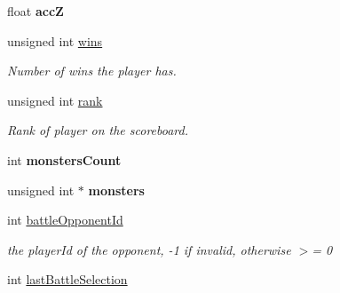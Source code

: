 \begin{DoxyCompactItemize}
\item 
\hypertarget{class_game_state_1_1_player_abec98fdec68ed34c3ff6bf202d4ac446}{float {\bfseries acc\-Z}}\label{class_game_state_1_1_player_abec98fdec68ed34c3ff6bf202d4ac446}

\item 
\hypertarget{class_game_state_1_1_player_aac7333a06ea194848f12090be762cdd6}{unsigned int \hyperlink{class_game_state_1_1_player_aac7333a06ea194848f12090be762cdd6}{wins}}\label{class_game_state_1_1_player_aac7333a06ea194848f12090be762cdd6}

\begin{DoxyCompactList}\small\item\em Number of wins the player has. \end{DoxyCompactList}\item 
\hypertarget{class_game_state_1_1_player_a43dd8a9e79c35d9615596fb6ab25d653}{unsigned int \hyperlink{class_game_state_1_1_player_a43dd8a9e79c35d9615596fb6ab25d653}{rank}}\label{class_game_state_1_1_player_a43dd8a9e79c35d9615596fb6ab25d653}

\begin{DoxyCompactList}\small\item\em Rank of player on the scoreboard. \end{DoxyCompactList}\item 
\hypertarget{class_game_state_1_1_player_a7f5bbae042c927e8dd0f27a189a18dea}{int {\bfseries monsters\-Count}}\label{class_game_state_1_1_player_a7f5bbae042c927e8dd0f27a189a18dea}

\item 
\hypertarget{class_game_state_1_1_player_a2cc3642e98d820c6e4fce5864254c79e}{unsigned int $\ast$ {\bfseries monsters}}\label{class_game_state_1_1_player_a2cc3642e98d820c6e4fce5864254c79e}

\item 
\hypertarget{class_game_state_1_1_player_ae60a4f411ef984c6d649d98c65b274bd}{int \hyperlink{class_game_state_1_1_player_ae60a4f411ef984c6d649d98c65b274bd}{battle\-Opponent\-Id}}\label{class_game_state_1_1_player_ae60a4f411ef984c6d649d98c65b274bd}

\begin{DoxyCompactList}\small\item\em the player\-Id of the opponent, -\/1 if invalid, otherwise $>$= 0 \end{DoxyCompactList}\item 
\hypertarget{class_game_state_1_1_player_a2383ab7d3783c5122f3e68230069eb2e}{int \hyperlink{class_game_state_1_1_player_a2383ab7d3783c5122f3e68230069eb2e}{last\-Battle\-Selection}}\label{class_game_state_1_1_player_a2383ab7d3783c5122f3e68230069eb2e}


\end{DoxyCompactItemize}
